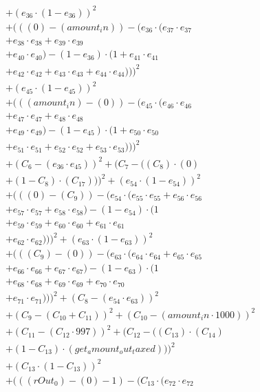 \documentclass[10pt, a4paper]{article}
\begin{document}
\begin{small}
\begin{align*}
& + (e_{36} \cdot (1 - e_{36}))^{2} \\
& + (((0) - (amount_in)) - (e_{36} \cdot (e_{37} \cdot e_{37} \\
& + e_{38} \cdot e_{38} + e_{39} \cdot e_{39} \\
& + e_{40} \cdot e_{40}) - (1 - e_{36}) \cdot (1 + e_{41} \cdot e_{41} \\
& + e_{42} \cdot e_{42} + e_{43} \cdot e_{43} + e_{44} \cdot e_{44})))^{2} \\
& + (e_{45} \cdot (1 - e_{45}))^{2} \\
& + (((amount_in) - (0)) - (e_{45} \cdot (e_{46} \cdot e_{46} \\
& + e_{47} \cdot e_{47} + e_{48} \cdot e_{48} \\
& + e_{49} \cdot e_{49}) - (1 - e_{45}) \cdot (1 + e_{50} \cdot e_{50} \\
& + e_{51} \cdot e_{51} + e_{52} \cdot e_{52} + e_{53} \cdot e_{53})))^{2} \\
& + (C_{6} - (e_{36} \cdot e_{45}))^{2} + (C_{7} - ((C_{8})  \cdot  (0) \\
& + (1 - C_{8})  \cdot  (C_{17})))^{2} + (e_{54} \cdot (1 - e_{54}))^{2} \\
& + (((0) - (C_{9})) - (e_{54} \cdot (e_{55} \cdot e_{55} + e_{56} \cdot e_{56} \\
& + e_{57} \cdot e_{57} + e_{58} \cdot e_{58}) - (1 - e_{54}) \cdot (1 \\
& + e_{59} \cdot e_{59} + e_{60} \cdot e_{60} + e_{61} \cdot e_{61} \\
& + e_{62} \cdot e_{62})))^{2} + (e_{63} \cdot (1 - e_{63}))^{2} \\
& + (((C_{9}) - (0)) - (e_{63} \cdot (e_{64} \cdot e_{64} + e_{65} \cdot e_{65} \\
& + e_{66} \cdot e_{66} + e_{67} \cdot e_{67}) - (1 - e_{63}) \cdot (1 \\
& + e_{68} \cdot e_{68} + e_{69} \cdot e_{69} + e_{70} \cdot e_{70} \\
& + e_{71} \cdot e_{71})))^{2} + (C_{8} - (e_{54} \cdot e_{63}))^{2} \\
& + (C_{9} - (C_{10} + C_{11}))^{2} + (C_{10} - (amount_in  \cdot  1000))^{2} \\
& + (C_{11} - (C_{12}  \cdot  997))^{2} + (C_{12} - ((C_{13})  \cdot  (C_{14}) \\
& + (1 - C_{13})  \cdot  (get_amount_out_taxed)))^{2} \\
& + (C_{13} \cdot (1 - C_{13}))^{2} \\
& + (((rOut_0) - (0) - 1) - (C_{13} \cdot (e_{72} \cdot e_{72} \\

\end{align*}
\end{small}
\end{document}
